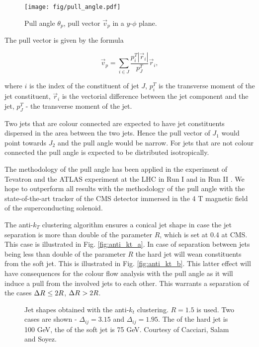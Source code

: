 \begin{figure}[hbtp]
  \centering
  \texttt{[image: fig/pull\_angle.pdf]}
  \caption{Pull angle $\theta_{p}$, pull vector $\vec{v}_{p}$ in a $y$-$\phi$ plane.}
  \label{fig:pull_angle}
\end{figure}

The pull vector is given by the formula

\begin{equation}
  \vec{v}_{p}=\sum_{i\in J}\frac{p^{T}_{i}|\vec{r}_{i}|}{p^{T}_{J}}\vec{r}_{i},
  \label{Eq:pull_angle}
\end{equation}

where $i$ is the index of the constituent of jet $J$, $p^{T}_{i}$ is the transverse moment of the jet constituent, $\vec{r}_{i}$ is the vectorial difference between the jet component and the jet, $p^{T}_{J}$ - the transverse moment of the jet.

Two jets that are colour connected are expected to have jet constituents dispersed in the area between the two jets. Hence the pull vector of $J_{1}$ would point towards $J_{2}$ and the pull angle would be narrow. For jets that are not colour connected the pull angle is expected to be distributed isotropically.

The methodology of the pull angle has been applied in the \DZERO experiment of Tevatron \cite{Abazov:2011vh} and the ATLAS experiment at the LHC in Run I \cite{Aad:2015lxa} and in Run II \cite{ATLAS:2017iaz}. We hope to outperform all results with the methodology of the pull angle with the state-of-the-art tracker of the CMS detector immersed in the 4 T magnetic field of the superconducting solenoid.

The anti-$k_{T}$ clustering algorithm ensures a conical jet shape in case the jet separation \DeltaR is more than double of the parameter $R$, which is set at 0.4 at CMS. This case is illustrated in Fig. \ref{fig:anti_kt_a}. In case of separation between jets \DeltaR being less than double of the parameter $R$ the hard jet will wean constituents from the soft jet. This is illustrated in Fig. \ref{fig:anti_kt_b}. This latter effect will have consequences for the colour flow analysis with the pull angle as it will induce a pull from the involved jets to each other. This warrants a separation of the cases $\Delta R^{}\leq2R$, $\Delta R^{}>2R$. 

\begin{figure}[hbtp]
  \def\twidth{0.5}
   \caption{Jet shapes obtained with the anti-$k_{t}$ clustering. $R=1.5$ is used. Two cases are shown - $\Delta_{ij}=3.15$ and  $\Delta_{ij}=1.95$. The \pt of the hard jet is 100 GeV, the \pt of the soft jet is 75 GeV. Courtesy of Cacciari, Salam and Soyez.}
  \label{fig:anti_kt}
\end{figure}

